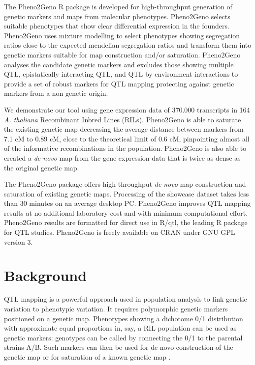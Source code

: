 The Pheno2Geno R package is developed for high-throughput generation of genetic markers and maps from 
molecular phenotypes. Pheno2Geno selects suitable phenotypes that show clear differential expression 
in the founders. Pheno2Geno uses mixture modelling to select phenotypes showing segregation ratios 
close to the expected mendelian segregation ratios and transform them into genetic markers suitable 
for map construction and/or saturation. Pheno2Geno analyses the candidate genetic markers and excludes 
those showing multiple QTL, epistatically interacting QTL, and QTL by environment interactions to 
provide a set of robust markers for QTL mapping protecting against genetic markers from a non genetic 
origin.

We demonstrate our tool using gene expression data of 370.000 transcripts in 164 \emph{A. thaliana} 
Recombinant Inbred Lines (RILs). Pheno2Geno is able to saturate the existing genetic map decreasing 
the average distance between markers from 7.1 cM to 0.89 cM, close to the theoretical limit of 0.6 cM, 
pinpointing almost all of the informative recombinations in the population. Pheno2Geno is also able 
to created a \emph{de-novo} map from the gene expression data that is twice as dense as the original 
genetic map.

The Pheno2Geno package offers high-throughput \emph{de-novo} map construction and saturation of 
existing genetic maps. Processing of the showcase dataset takes less than 30 minutes on an average 
desktop PC. Pheno2Geno improves QTL mapping results at no additional laboratory cost and with 
minimum computational effort. Pheno2Geno results are formatted for direct use in R/qtl, the leading 
R package for QTL studies. Pheno2Geno is freely available on CRAN under GNU GPL version 3.

\section{Background}
QTL mapping \cite{Lander:1989} is a powerful approach used in population analysis to link 
genetic variation to phenotypic variation. It requires polymorphic genetic markers positioned 
on a genetic map. Phenotypes showing a dichotome 0/1 distribution with approximate equal 
proportions in, say, a RIL population can be used as genetic markers: genotypes can be 
called by connecting the 0/1 to the parental strains A/B. Such markers can then be used 
for de-novo construction of the genetic map or for saturation of a known genetic map 
\cite{West:2006, Truco:2013}.

